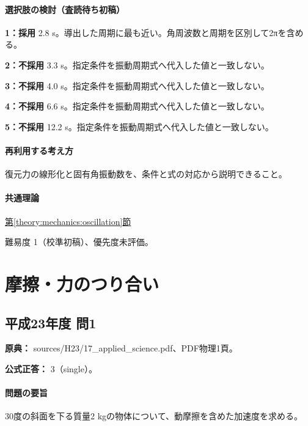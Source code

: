 \paragraph{選択肢の検討（査読待ち初稿）}

\noindent\textbf{1：採用} 2.8 s。導出した周期に最も近い。角周波数と周期を区別して2πを含める。\par

\noindent\textbf{2：不採用} 3.3 s。指定条件を振動周期式へ代入した値と一致しない。\par

\noindent\textbf{3：不採用} 4.0 s。指定条件を振動周期式へ代入した値と一致しない。\par

\noindent\textbf{4：不採用} 6.6 s。指定条件を振動周期式へ代入した値と一致しない。\par

\noindent\textbf{5：不採用} 12.2 s。指定条件を振動周期式へ代入した値と一致しない。\par

\paragraph{再利用する考え方} 復元力の線形化と固有角振動数を、条件と式の対応から説明できること。

\paragraph{共通理論} \hyperref[theory:mechanics:oscillation]{第\ref*{theory:mechanics:oscillation}節}

\par 難易度 1（校準初稿）、優先度未評価。

\section{摩擦・力のつり合い}

\subsection{平成23年度 問1}
\label{q:h23-reg-applied-01}

\noindent\textbf{原典：} sources/H23/17\_applied\_science.pdf、PDF物理1頁。

\textbf{公式正答：} 3（single）。

\paragraph{問題の要旨} 30度の斜面を下る質量2 kgの物体について、動摩擦を含めた加速度を求める。

